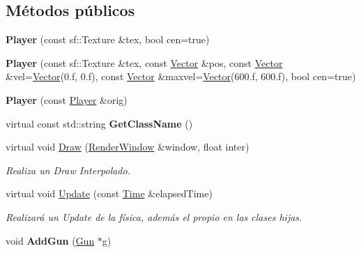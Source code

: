 \subsection*{Métodos públicos}
\begin{DoxyCompactItemize}
\item 
\hypertarget{classPlayer_acddb2634188f14201f7eaa29d8f2611d}{{\bfseries Player} (const sf\-::\-Texture \&tex, bool cen=true)}\label{classPlayer_acddb2634188f14201f7eaa29d8f2611d}

\item 
\hypertarget{classPlayer_a0b67a0b2cbbf4880c35de511fa361dea}{{\bfseries Player} (const sf\-::\-Texture \&tex, const \hyperlink{classVector}{Vector} \&pos, const \hyperlink{classVector}{Vector} \&vel=\hyperlink{classVector}{Vector}(0.f, 0.f), const \hyperlink{classVector}{Vector} \&maxvel=\hyperlink{classVector}{Vector}(600.f, 600.f), bool cen=true)}\label{classPlayer_a0b67a0b2cbbf4880c35de511fa361dea}

\item 
\hypertarget{classPlayer_a3fda0565e6cb6d24c72160e6f88525f2}{{\bfseries Player} (const \hyperlink{classPlayer}{Player} \&orig)}\label{classPlayer_a3fda0565e6cb6d24c72160e6f88525f2}

\item 
\hypertarget{classPlayer_a089deaac2cdf0522d61ebe00647e9054}{virtual const std\-::string {\bfseries Get\-Class\-Name} ()}\label{classPlayer_a089deaac2cdf0522d61ebe00647e9054}

\item 
virtual void \hyperlink{classPlayer_a6fa2109456d203d45b0460fa53ff247b}{Draw} (\hyperlink{classRenderWindow}{Render\-Window} \&window, float inter)
\begin{DoxyCompactList}\small\item\em Realiza un Draw Interpolado. \end{DoxyCompactList}\item 
\hypertarget{classPlayer_ae080f22f3c126845623b043a794175c8}{virtual void \hyperlink{classPlayer_ae080f22f3c126845623b043a794175c8}{Update} (const \hyperlink{classTime}{Time} \&elapsed\-Time)}\label{classPlayer_ae080f22f3c126845623b043a794175c8}

\begin{DoxyCompactList}\small\item\em Realizará un Update de la física, además el propio en las clases hijas. \end{DoxyCompactList}\item 
\hypertarget{classPlayer_a332f6a6235d2cf5f60bd5e8ea11f2b96}{void {\bfseries Add\-Gun} (\hyperlink{classGun}{Gun} $\ast$g)}\label{classPlayer_a332f6a6235d2cf5f60bd5e8ea11f2b96}


\end{DoxyCompactItemize}
